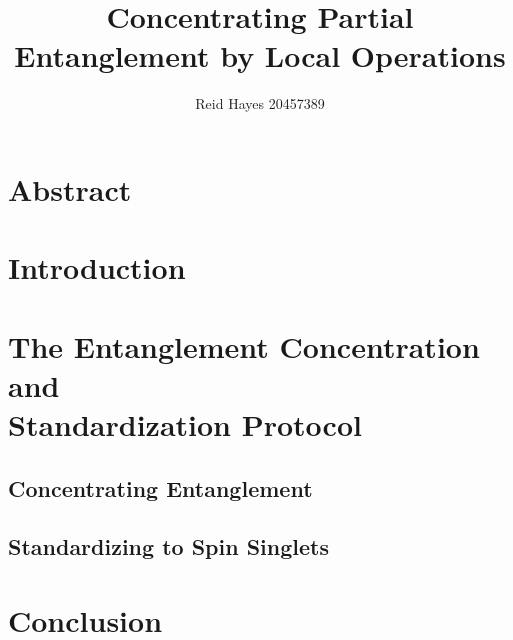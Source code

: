 \documentclass[12pt,letterpaper]{article}
\author{Reid Hayes 20457389}
\title{Concentrating Partial Entanglement by Local Operations}
\begin{document}
\maketitle
\section{Abstract}
\section{Introduction}


\section{The Entanglement Concentration and \\Standardization Protocol}
\subsection{Concentrating Entanglement}
\label{sec:concentrating}


\subsection{Standardizing to Spin Singlets}
\label{sec:standardizing}

\section{Conclusion}

\printbibliography
\end{document}
